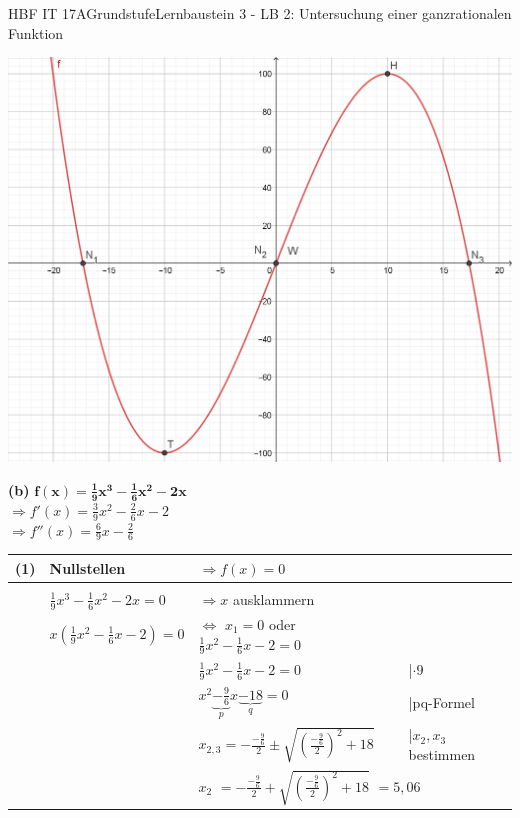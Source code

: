 \documentclass[oneside,openany,headings=optiontotoc,11pt,numbers=noenddot]{scrreprt}
\begin{document}
\begin{worksheet}{HBF IT 17A}{Grundstufe}{Lernbaustein 3 - LB 2: Untersuchung einer ganzrationalen Funktion}
\begin{framed}
			\includegraphics[scale=0.5]{Bilder/HAa.png}
		\end{framed}
		\newpage
		\begin{framed}
			\noindent
			\textbf{(b)} \(\mathbf{f(x) = \frac{1}{9}x^3 -\frac{1}{6}x^2 -2x}\)\\
			\(\Rightarrow f'(x) = \frac{3}{9}x^2 -\frac{2}{6}x -2\)\\
			\(\Rightarrow f''(x) = \frac{6}{9}x - \frac{2}{6}\)\\
			\par\noindent
			\begin{tabularx}{\textwidth}{lXXl}
				(1) & Nullstellen & \(\Rightarrow f(x) = 0\)\\
				\hline\\
				& \(\frac{1}{9}x^3 -\frac{1}{6}x^2 -2x = 0\) & \(\Rightarrow x\) ausklammern\\
				& \( x(\frac{1}{9}x^2 -\frac{1}{6}x -2) = 0\) & \(\Leftrightarrow\) \colorbox{green!10}{\(x_1 = 0\)} oder \(\frac{1}{9}x^2 -\frac{1}{6}x -2 = 0\)\\
				& & \(\frac{1}{9}x^2 -\frac{1}{6}x -2 = 0\) & |\(\cdot9\)\\
				& & \(x^2 \underbrace{-\frac{9}{6}}_{p}x \underbrace{-18}_{q} = 0\) & |pq-Formel\\
				& & \(x_{2,3} = -\frac{-\frac{9}{6}}{2} \pm \sqrt{\left(\frac{-\frac{9}{6}}{2}\right)^2 +18}\) & |\(x_2,x_3\) bestimmen\\
				& & \multicolumn{2}{l}{\colorbox{green!10}{\(x_2\)} \(= -\frac{-\frac{9}{6}}{2} + \sqrt{\left(\frac{-\frac{9}{6}}{2}\right)^2 +18}\) \colorbox{green!10}{\(= 5,06\)}}\\

\end{tabularx}
\end{framed}
\end{worksheet}
\end{document}
